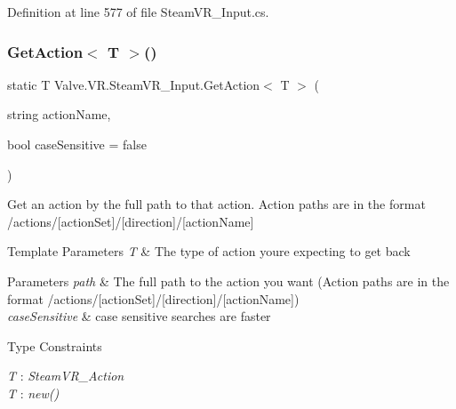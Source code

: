 Definition at line 577 of file Steam\+V\+R\+\_\+\+Input.\+cs.

\mbox{\label{class_valve_1_1_v_r_1_1_steam_v_r___input_a3e5281b6293539de5de4ba4de967d72b}} 
\subsubsection{\texorpdfstring{GetAction$<$ T $>$()}{GetAction< T >()}\hspace{0.1cm}{\footnotesize\ttfamily [2/2]}}
{\footnotesize\ttfamily static T Valve.\+V\+R.\+Steam\+V\+R\+\_\+\+Input.\+Get\+Action$<$ T $>$ (\begin{DoxyParamCaption}\item[{string}]{action\+Name,  }\item[{bool}]{case\+Sensitive = {\ttfamily false} }\end{DoxyParamCaption})\hspace{0.3cm}{\ttfamily [static]}}



Get an action by the full path to that action. Action paths are in the format /actions/\mbox{[}action\+Set\mbox{]}/\mbox{[}direction\mbox{]}/\mbox{[}action\+Name\mbox{]} 


\begin{DoxyTemplParams}{Template Parameters}
{\em T} & The type of action you\textquotesingle{}re expecting to get back\\
\hline
\end{DoxyTemplParams}

\begin{DoxyParams}{Parameters}
{\em path} & The full path to the action you want (Action paths are in the format /actions/\mbox{[}action\+Set\mbox{]}/\mbox{[}direction\mbox{]}/\mbox{[}action\+Name\mbox{]})\\
\hline
{\em case\+Sensitive} & case sensitive searches are faster\\
\hline
\end{DoxyParams}
\begin{Desc}
\item[Type Constraints]\begin{description}
\item[{\em T} : {\em Steam\+V\+R\+\_\+\+Action}]\item[{\em T} : {\em new()}]\end{description}
\end{Desc}


